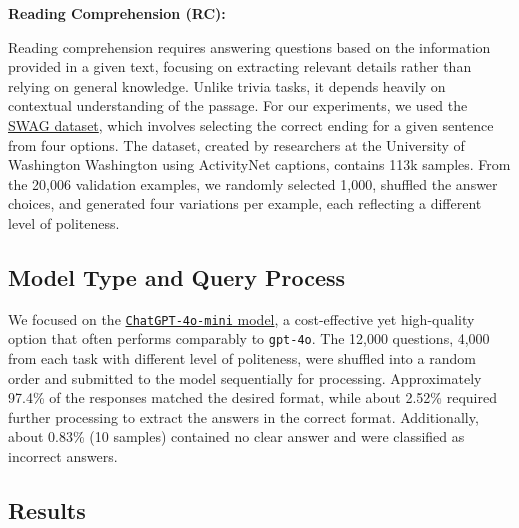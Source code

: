 \documentclass[11pt]{article}
\begin{document}
\textbf{Reading Comprehension (RC):} 

Reading comprehension requires answering questions based on the information provided in a given text, focusing on extracting relevant details rather than relying on general knowledge. Unlike trivia tasks, it depends heavily on contextual understanding of the passage. For our experiments, we used the \href{https://huggingface.co/datasets/allenai/swag}{SWAG dataset}, which involves selecting the correct ending for a given sentence from four options. The dataset, created by researchers at the University of Washington Washington \citep{zellers18-swag} using ActivityNet captions, contains 113k samples. From the 20,006 validation examples, we randomly selected 1,000, shuffled the answer choices, and generated four variations per example, each reflecting a different level of politeness.

\subsection{Model Type and Query Process}
We focused on the \href{https://openai.com/index/gpt-4o-mini-advancing-cost-efficient-intelligence/}{\texttt{ChatGPT-4o-mini} model}, a cost-effective yet high-quality option that often performs comparably to \texttt{gpt-4o}.
The 12,000 questions, 4,000 from each task with different level of politeness, were shuffled into a random order and submitted to the model sequentially for processing. Approximately 97.4\% of the responses matched the desired format, while about 2.52\% required further processing to extract the answers in the correct format. Additionally, about 0.83\% (10 samples) contained no  clear answer and were classified as incorrect answers.


\subsection{Results}
\end{document}
